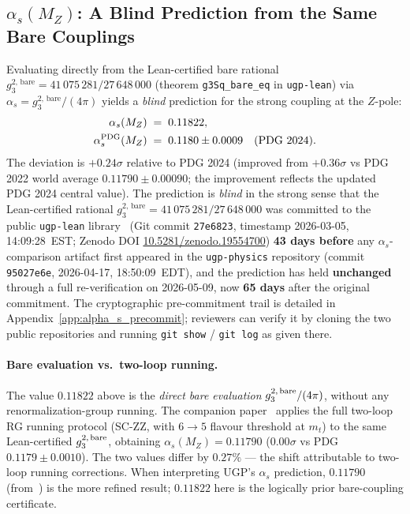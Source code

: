 \documentclass[11pt]{article}
\theoremstyle{remark}
\begin{document}
\subsection{\texorpdfstring{$\alpha_s(M_Z)$}{alpha_s(MZ)}: A Blind Prediction from the Same Bare Couplings}
\label{subsec:alpha_s_blind}

Evaluating directly from the Lean-certified bare rational $g_3^{2,\,\mathrm{bare}} = 41\,075\,281/27\,648\,000$ (theorem \texttt{g3Sq\_bare\_eq} in \texttt{ugp-lean}) via $\alpha_s = g_3^{2,\,\mathrm{bare}}/(4\pi)$ yields a \emph{blind} prediction for the strong coupling at the $Z$-pole:
\begin{align}
  \alpha_s(M_Z) &\;=\; 0.11822, \\
  \alpha_s^{\rm PDG}(M_Z) &\;=\; 0.1180 \pm 0.0009 \quad \text{(PDG 2024).}
\end{align}
The deviation is $+0.24\sigma$ relative to PDG 2024 (improved from $+0.36\sigma$ vs PDG 2022 world average $0.11790 \pm 0.00090$; the improvement reflects the updated PDG 2024 central value).  The prediction is \emph{blind} in the strong sense that the Lean-certified rational $g_3^{2,\,\mathrm{bare}} = 41\,075\,281/27\,648\,000$ was committed to the public \texttt{ugp-lean} library~\cite{ugp-lean} (Git commit \texttt{27e6823}, timestamp 2026-03-05, 14:09:28~EST; Zenodo DOI \href{https://doi.org/10.5281/zenodo.19554700}{10.5281/zenodo.19554700}) \textbf{43 days before} any $\alpha_s$-comparison artifact first appeared in the \texttt{ugp-physics} repository (commit \texttt{95027e6e}, 2026-04-17, 18:50:09~EDT), and the prediction has held \textbf{unchanged} through a full re-verification on 2026-05-09, now \textbf{65 days} after the original commitment.  The cryptographic pre-commitment trail is detailed in Appendix~\ref{app:alpha_s_precommit}; reviewers can verify it by cloning the two public repositories and running \texttt{git show} / \texttt{git log} as given there.

\paragraph{Bare evaluation vs.\ two-loop running.}
The value $0.11822$ above is the \emph{direct bare evaluation} $g_3^{2,\,\rm bare}/(4\pi)$, without any renormalization-group running.  The companion paper~\cite{Spivack2026_UGPDynamics} applies the full two-loop RG running protocol (SC-ZZ, with $6{\to}5$ flavour threshold at $m_t$) to the same Lean-certified $g_3^{2,\,\rm bare}$, obtaining $\alpha_s(M_Z) = 0.11790$ ($0.00\sigma$ vs PDG $0.1179 \pm 0.0010$).  The two values differ by $0.27\%$ --- the shift attributable to two-loop running corrections.  When interpreting UGP's $\alpha_s$ prediction, $0.11790$ (from~\cite{Spivack2026_UGPDynamics}) is the more refined result; $0.11822$ here is the logically prior bare-coupling certificate.
\end{document}
